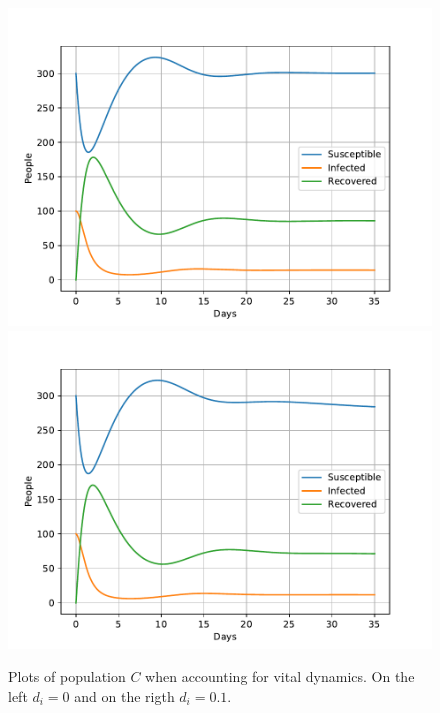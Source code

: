 \documentclass[a4paper]{article}
\begin{document}
\begin{figure}[!htb]
	\includegraphics[scale=0.56]{../plots/opp_c_C0.pdf}
	\includegraphics[scale=0.56]{../plots/opp_c_C1.pdf}
	\caption{Plots of population $C$ when accounting for vital dynamics. On the left $d_i=0$ and on the rigth $d_i=0.1$.}
	\label{opp_c0C}
\end{figure}
\end{document}
